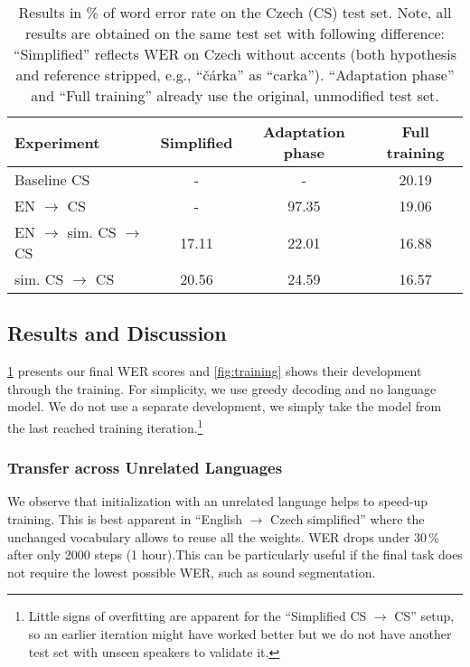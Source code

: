 \begin{table}[t]
\small\centering
\begin{tabular}{lc|cc}
\bf Experiment & \bf Simplified & \bf Adaptation phase & \bf Full training \\
\hline
 Baseline CS & - &  - &  20.19 \\
 EN $\rightarrow$ CS & -  & 97.35 &  19.06  \\
 EN $\rightarrow$ sim. CS $\rightarrow$ CS & 17.11  & 22.01 &  16.88 \\
 sim. CS $\rightarrow$ CS & 20.56  &  24.59 &  16.57  \\
\end{tabular}
\caption{Results in \% of word error rate on the Czech (CS) test set. Note, all results are obtained on the same test set with following difference: ``Simplified'' reflects WER on Czech without accents (both hypothesis and reference stripped, e.g., ``\v{c}\'arka'' as ``carka''). ``Adaptation phase'' and ``Full training'' already use the original, unmodified test set.}
\label{tab:results}
\end{table}



\subsection{Results and Discussion}
\label{sec:results}


\cref{tab:results} presents our final WER scores and \cref{fig:training} shows their development through the training. For simplicity, we use greedy decoding and no language model. We do not use a separate development,
we simply take the model from the last reached training iteration.\footnote{Little signs of overfitting are apparent for the ``Simplified CS $\rightarrow$ CS'' setup, so an earlier iteration might have worked better but we do not have another test set with unseen speakers to validate it.}

\subsubsection{Transfer across Unrelated Languages}

We observe that initialization %
with an unrelated language helps to speed-up training. This is best apparent in ``English $\rightarrow$ Czech simplified'' where the unchanged vocabulary allows to reuse all the weights. WER drops under 30\,\%  after only 2000 steps (1 hour).This can be particularly useful if the final task does not require the lowest possible WER, such as sound segmentation.


